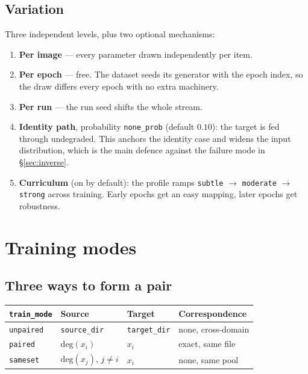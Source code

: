 \documentclass[11pt,a4paper]{article}
\newcommand{\code}[1]{\texttt{#1}}
\begin{document}
\subsection{Variation}

Three independent levels, plus two optional mechanisms:

\begin{enumerate}[leftmargin=1.4em]
  \item \textbf{Per image} --- every parameter drawn independently per item.
  \item \textbf{Per epoch} --- free. The dataset seeds its generator with the
        epoch index, so the draw differs every epoch with no extra machinery.
  \item \textbf{Per run} --- the run seed shifts the whole stream.
  \item \textbf{Identity path}, probability \code{none\_prob} (default $0.10$):
        the target is fed through undegraded. This anchors the identity case and
        widens the input distribution, which is the main defence against the
        failure mode in \S\ref{sec:inverse}.
  \item \textbf{Curriculum} (on by default): the profile ramps
        \code{subtle} $\rightarrow$ \code{moderate} $\rightarrow$ \code{strong}
        across training. Early epochs get an easy mapping, later epochs get
        robustness.
\end{enumerate}

\section{Training modes}

\subsection{Three ways to form a pair}

\begin{center}
\begin{tabular}{@{}llll@{}}
\toprule
\code{train\_mode} & Source & Target & Correspondence \\
\midrule
\code{unpaired} & \code{source\_dir} & \code{target\_dir} & none, cross-domain \\
\code{paired}   & $\mathrm{deg}(x_i)$ & $x_i$ & exact, same file \\
\code{sameset}  & $\mathrm{deg}(x_j)$, $j \neq i$ & $x_i$ & none, same pool \\
\bottomrule
\end{tabular}
\end{center}
\end{document}
